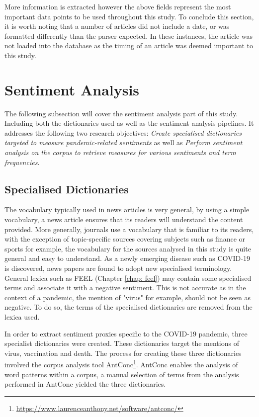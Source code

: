More information is extracted however the above fields represent the most important data points to be used throughout this study. To conclude this section, it is worth noting that a number of articles did not include a date, or was formatted differently than the parser expected. In these instances, the article was not loaded into the database as the timing of an article was deemed important to this study.

\section{Sentiment Analysis}

The following subsection will cover the sentiment analysis part of this study. Including both the dictionaries used as well as the sentiment analysis pipelines. It addresses the following two research objectives: \emph{Create specialised dictionaries targeted to measure pandemic-related sentiments} as well as \emph{Perform sentiment analysis on the corpus to retrieve measures for various sentiments and term frequencies}.
 
\subsection{Specialised Dictionaries}\label{Custom Dicts}

The vocabulary typically used in news articles is very general, by using a simple vocabulary, a news article ensures that its readers will understand the content provided. More generally, journals use a vocabulary that is familiar to its readers, with the exception of topic-specific sources covering subjects such as finance or sports for example, the vocabulary for the sources analysed in this study is quite general and easy to understand. As a newly emerging disease such as COVID-19 is discovered, news papers are found to adopt new specialised terminology. General lexica such as FEEL (Chapter \ref{chap: feel}) may contain some specialised terms and associate it with a negative sentiment. This is not accurate as in the context of a pandemic, the mention of "virus" for example, should not be seen as negative. To do so, the terms of the specialised dictionaries are removed from the lexica used.

In order to extract sentiment proxies specific to the COVID-19 pandemic, three specialist dictionaries were created. These dictionaries target the mentions of virus, vaccination and death. The process for creating these three dictionaries involved the corpus analysis tool AntConc\footnote{\url{https://www.laurenceanthony.net/software/antconc/}}. AntConc enables the analysis of word patterns within a corpus, a manual selection of terms from the analysis performed in AntConc yielded the three dictionaries.

